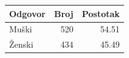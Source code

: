 \begin{tabular}{lrr}
\toprule
Odgovor & Broj & Postotak \\
\midrule
Muški & 520 & 54.51 \\
Ženski & 434 & 45.49 \\
\bottomrule
\end{tabular}
